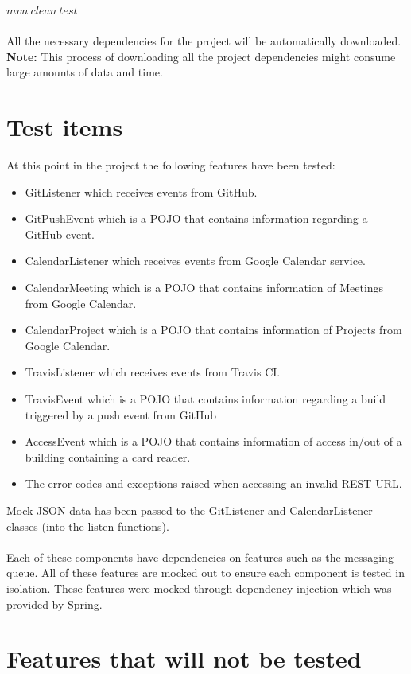 \documentclass[11pt,a4paper]{article}
\begin{document}
$mvn\ clean\ test$ \\\\
All the necessary dependencies for the project will be automatically downloaded. \textbf{Note:} This process of downloading all the project dependencies might consume large amounts of data and time.

\section{Test items}
At this point in the project the following features have been tested:
\begin{itemize}
	\item GitListener which receives events from GitHub.
	\item GitPushEvent which is a POJO that contains information regarding a GitHub event.
	\item CalendarListener which receives events from Google Calendar service.
	\item CalendarMeeting which is a POJO that contains information of Meetings from Google Calendar.
	\item CalendarProject which is a POJO that contains information of Projects from Google Calendar. 
	\item TravisListener which receives events from Travis CI.
	\item TravisEvent which is a POJO that contains information regarding a build triggered by a push event from GitHub
	\item AccessEvent which is a POJO that contains information of access in/out of a building containing a card reader.
	\item The error codes and exceptions raised when accessing an invalid REST URL.
	 
\end{itemize}

Mock JSON data has been passed to the GitListener and CalendarListener classes (into the listen functions). \\\\
Each of these components have dependencies on features such as the messaging queue. All of these features are mocked out to ensure each component is tested in isolation. These features were mocked through dependency injection which was provided by Spring. \\

\section{Features that will not be tested}
\end{document}
